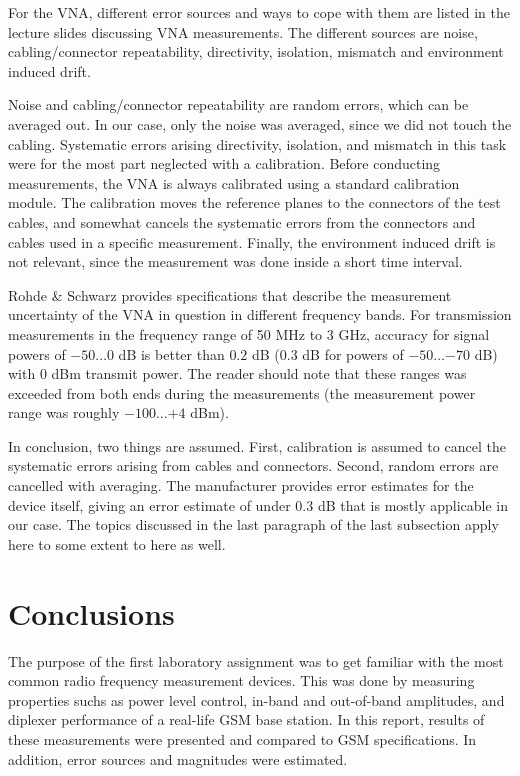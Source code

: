 \documentclass[a4paper, 12pt]{article}
\begin{document}
For the VNA, different error sources and ways to cope with them are listed in the 
lecture slides discussing VNA measurements. The different sources are noise, 
cabling/connector repeatability, directivity, isolation, mismatch and environment 
induced drift. 

Noise and cabling/connector repeatability are random errors, which can be averaged 
out. In our case, only the noise was averaged, since we did not touch the cabling. 
Systematic errors arising directivity, isolation, and mismatch in this task were
for the most part neglected with a calibration. Before conducting measurements, 
the VNA is always calibrated using a standard calibration module. The calibration 
moves the reference planes to the connectors of the test cables, and somewhat 
cancels the systematic errors from the connectors and cables used in a specific 
measurement. Finally, the environment induced drift is not relevant, since the 
measurement was done inside a short time interval.

Rohde \& Schwarz provides specifications that describe the measurement uncertainty 
of the VNA in question in different frequency bands. For transmission measurements 
in the frequency range of 50 MHz to 3 GHz, accuracy for signal powers of $-50 \ldots 0$ 
dB is better than $0.2$ dB ($0.3$ dB for powers of $-50 \ldots {-70}$ dB) with 0 dBm 
transmit power. \cite{vna} The reader should note that these ranges was exceeded 
from both ends during the measurements (the measurement power range was roughly 
$-100 \ldots {+4}$ dBm). 

In conclusion, two things are assumed. First, calibration is assumed to cancel the 
systematic errors arising from cables and connectors. Second, random errors are 
cancelled with averaging. The manufacturer provides error estimates for the device 
itself, giving an error estimate of under $0.3$ dB that is mostly applicable in 
our case. The topics discussed in the last paragraph of the last subsection apply 
here to some extent to here as well.


\newpage
\section{Conclusions}

The purpose of the first laboratory assignment was to get familiar with the most 
common radio frequency measurement devices. This was done by measuring properties 
suchs as power level control, in-band and out-of-band amplitudes, and diplexer 
performance of a real-life GSM base station. In this report, results of these measurements
were presented and compared to GSM specifications. In addition, error sources 
and magnitudes were estimated.
\end{document}
